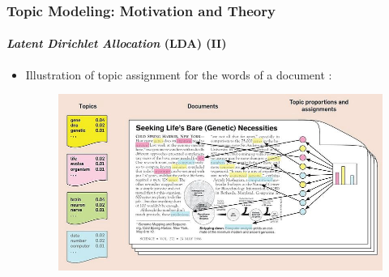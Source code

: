 \documentclass[xcolor=dvipsnames]{beamer}
\begin{document}
\begin{frame}
\frametitle{Topic Modeling: Motivation and Theory}
\framesubtitle{\textit{Latent Dirichlet Allocation} (LDA) (II)}
\begin{itemize}
\vspace{-0.5cm}
\item Illustration of topic assignment for the words of a document \parencite{blei2012probabilistic}:
	\vspace{-0.5cm}
	\begin{figure}[h!]
  	\centering
  	\includegraphics[scale = 0.4]{../plots/presentation/lda_topic_assignment.jpeg}
	\end{figure}
\end{itemize}
\end{frame}
\end{document}
